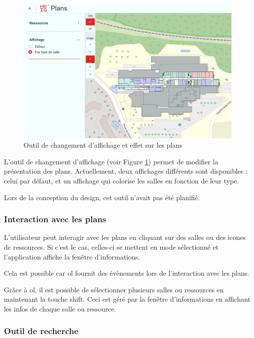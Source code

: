 \documentclass[
    iai, %
    il, %
]{heig-tb}
\begin{document}
\begin{figure}[h]
    \centering
    \includegraphics[scale=0.4]{frontend-affichageParType.png}
    \caption{Outil de changement d'affichage et effet sur les plans}
    \label{fig:affichage}
\end{figure}

L'outil de changement d'affichage (voir Figure \ref{fig:affichage}) permet de modifier la présentation des plans.
Actuellement, deux affichages différents sont disponibles :
celui par défaut, et un affichage qui colorise les salles en fonction de leur type.

Lors de la conception du design, cet outil n'avait pas été planifié.

\subsubsection{Interaction avec les plans}
L'utilisateur peut interagir avec les plans en cliquant sur des salles ou des icones de ressources.
Si c'est le cas, celles-ci se mettent en mode sélectionné et l'application affiche la fenêtre d'informations.

Cela est possible car \gls{ol} fournit des évènements lors de l'interaction avec les plans.

Grâce à \gls{ol}, il est possible de sélectionner plusieurs salles ou ressources en maintenant la touche shift.
Ceci est géré par la fenêtre d'informations en affichant les infos de chaque salle ou ressource.

\subsubsection{Outil de recherche}
\end{document}
